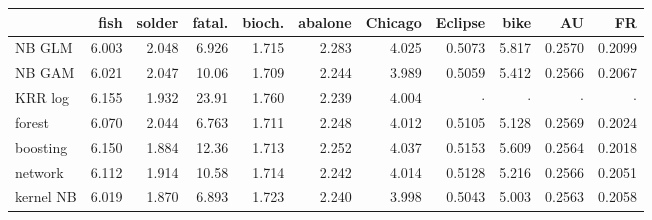 \begin{tabular}{@{}lrrrrrrrrrr@{}}
\toprule
 & fish & solder & fatal. & bioch. & abalone & Chicago & Eclipse & bike & AU & FR \\
\midrule
NB GLM & 6.003 & 2.048 & 6.926 & 1.715 & 2.283 & 4.025 & 0.5073 & 5.817 & 0.2570 & 0.2099 \\
NB GAM & 6.021 & 2.047 & 10.06 & 1.709 & 2.244 & 3.989 & 0.5059 & 5.412 & 0.2566 & 0.2067 \\
KRR log & 6.155 & 1.932 & 23.91 & 1.760 & 2.239 & 4.004 & $\cdot$ & $\cdot$ & $\cdot$ & $\cdot$ \\
forest & 6.070 & 2.044 & 6.763 & 1.711 & 2.248 & 4.012 & 0.5105 & 5.128 & 0.2569 & 0.2024 \\
boosting & 6.150 & 1.884 & 12.36 & 1.713 & 2.252 & 4.037 & 0.5153 & 5.609 & 0.2564 & 0.2018 \\
network & 6.112 & 1.914 & 10.58 & 1.714 & 2.242 & 4.014 & 0.5128 & 5.216 & 0.2566 & 0.2051 \\
kernel NB & 6.019 & 1.870 & 6.893 & 1.723 & 2.240 & 3.998 & 0.5043 & 5.003 & 0.2563 & 0.2058 \\
\bottomrule
\end{tabular}
